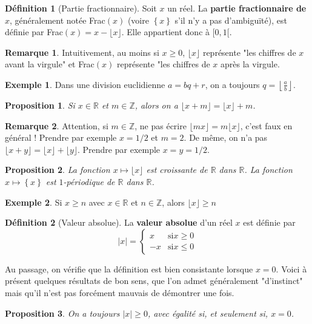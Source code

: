 \documentclass[french]{book}
\newcommand{\Z}{\mathbb{Z}}
\newcommand{\R}{\mathbb{R}}
\theoremstyle{plain}
\newtheorem{prop}{Proposition}[chapter]
\theoremstyle{definition}
\newtheorem{dfn}{Définition}[chapter]
\newtheorem{exa}{Exemple}[chapter]
\newtheorem{rmq}{Remarque}[chapter]
\theoremstyle{remark}
\begin{document}
\begin{dfn}[Partie fractionnaire]
	Soit $x$ un réel. La \textbf{partie fractionnaire de $x$}, généralement notée Frac$(x)$ (voire $\left\{x\right\}$ s'il n'y a pas d'ambiguïté), est définie par Frac$(x)=x-\lfloor x\rfloor$. Elle appartient donc à $[0,1[$.
\end{dfn}
\begin{rmq}
	Intuitivement, au moins si $x\geqslant0$, $\lfloor x\rfloor$ représente "les chiffres de $x$ avant la virgule" et Frac$(x)$ représente "les chiffres de $x$ après la virgule.
\end{rmq}
\begin{exa}
	Dans une division euclidienne $a=bq+r$, on a toujours $q=\displaystyle\left\lfloor\frac{a}{b}\right\rfloor$.
\end{exa}
\begin{prop}
	Si $x\in\R$ et $m\in\Z$, alors on a $\lfloor x+m\rfloor=\lfloor x\rfloor+m$.
\end{prop}
\begin{rmq}
	Attention, si $m\in\Z$, ne pas écrire $\lfloor mx\rfloor=m\lfloor x\rfloor$, c'est faux en général ! Prendre par exemple $x=1/2$ et $m=2$. De même, on n'a pas $\lfloor x+y\rfloor=\lfloor x\rfloor+\lfloor y\rfloor$. Prendre par exemple $x=y=1/2$.
\end{rmq}
\begin{prop}
	La fonction $x\mapsto\lfloor x\rfloor$ est croissante de $\R$ dans $\R$. La fonction $x\mapsto \left\{x\right\}$ est $1$-périodique de $\R$ dans $\R$.
\end{prop}
\begin{exa}
	Si $x\geqslant n$ avec $x\in\R$ et $n\in\Z$, alors $\lfloor x\rfloor\geqslant n$
\end{exa}
\begin{dfn}[Valeur absolue]
	La \textbf{valeur absolue} d'un réel $x$ est définie par $$\lvert x\rvert=\left \{\begin{array}{ll}x&\text{si}x\geqslant0 \\ -x&\text{si}x\leqslant0\end{array}\right.$$
\end{dfn}
Au passage, on vérifie que la définition est bien consistante lorsque $x=0$. Voici à présent quelques résultats de bon sens, que l'on admet généralement "d'instinct" mais qu'il n'est pas forcément mauvais de démontrer une fois.
\begin{prop}
	On a toujours $\lvert x\rvert \geqslant0$, avec égalité si, et seulement si, $x=0$.
\end{prop}
\end{document}
